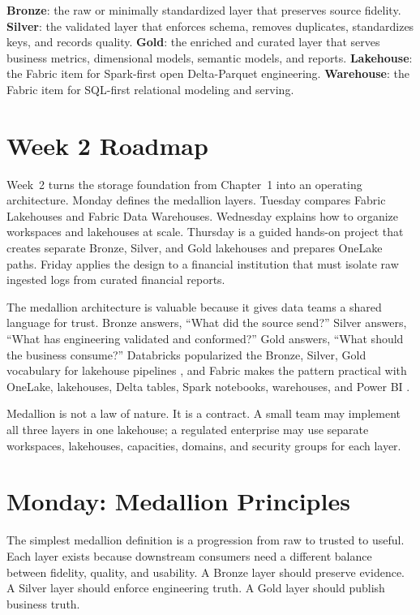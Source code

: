 \begin{keyterms}
\textbf{Bronze}: the raw or minimally standardized layer that preserves source fidelity. \quad
\textbf{Silver}: the validated layer that enforces schema, removes duplicates, standardizes keys, and records quality. \quad
\textbf{Gold}: the enriched and curated layer that serves business metrics, dimensional models, semantic models, and reports. \quad
\textbf{Lakehouse}: the Fabric item for Spark-first open Delta-Parquet engineering. \quad
\textbf{Warehouse}: the Fabric item for SQL-first relational modeling and serving.
\end{keyterms}

\section{Week 2 Roadmap}
Week~2 turns the storage foundation from Chapter~1 into an operating architecture. Monday defines the medallion layers. Tuesday compares Fabric Lakehouses and Fabric Data Warehouses. Wednesday explains how to organize workspaces and lakehouses at scale. Thursday is a guided hands-on project that creates separate Bronze, Silver, and Gold lakehouses and prepares OneLake paths. Friday applies the design to a financial institution that must isolate raw ingested logs from curated financial reports.

The medallion architecture is valuable because it gives data teams a shared language for trust. Bronze answers, ``What did the source send?'' Silver answers, ``What has engineering validated and conformed?'' Gold answers, ``What should the business consume?'' Databricks popularized the Bronze, Silver, Gold vocabulary for lakehouse pipelines \cite{databricksMedallion}, and Fabric makes the pattern practical with OneLake, lakehouses, Delta tables, Spark notebooks, warehouses, and Power BI \cite{microsoftFabricLakehouse,microsoftOneLakeOverview}.

\begin{notebox}
Medallion is not a law of nature. It is a contract. A small team may implement all three layers in one lakehouse; a regulated enterprise may use separate workspaces, lakehouses, capacities, domains, and security groups for each layer.
\end{notebox}

\section{Monday: Medallion Principles}
The simplest medallion definition is a progression from raw to trusted to useful. Each layer exists because downstream consumers need a different balance between fidelity, quality, and usability. A Bronze layer should preserve evidence. A Silver layer should enforce engineering truth. A Gold layer should publish business truth.

